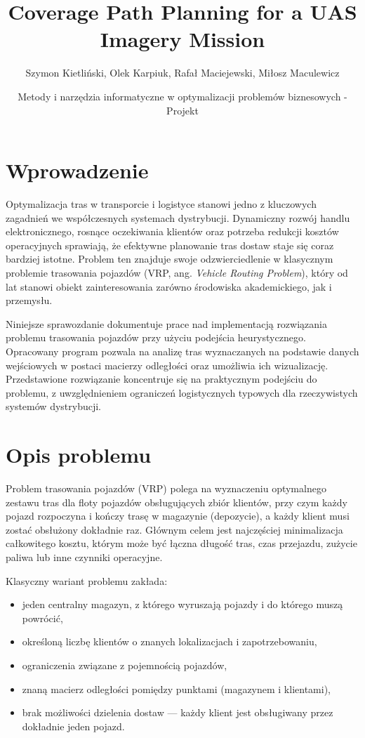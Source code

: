 \documentclass{article}
\title{Coverage Path Planning for a UAS Imagery Mission}
\author{Szymon Kietliński, Olek Karpiuk, Rafał Maciejewski, Miłosz Maculewicz}
\date{Metody i narzędzia informatyczne w optymalizacji problemów biznesowych - Projekt}
\begin{document}
\maketitle
\section{Wprowadzenie}

Optymalizacja tras w transporcie i logistyce stanowi jedno z kluczowych zagadnień we współczesnych systemach dystrybucji. Dynamiczny rozwój handlu elektronicznego, rosnące oczekiwania klientów oraz potrzeba redukcji kosztów operacyjnych sprawiają, że efektywne planowanie tras dostaw staje się coraz bardziej istotne. Problem ten znajduje swoje odzwierciedlenie w klasycznym problemie trasowania pojazdów (VRP, ang. \textit{Vehicle Routing Problem}), który od lat stanowi obiekt zainteresowania zarówno środowiska akademickiego, jak i przemysłu.

Niniejsze sprawozdanie dokumentuje prace nad implementacją rozwiązania problemu trasowania pojazdów przy użyciu podejścia heurystycznego. Opracowany program pozwala na analizę tras wyznaczanych na podstawie danych wejściowych w postaci macierzy odległości oraz umożliwia ich wizualizację. Przedstawione rozwiązanie koncentruje się na praktycznym podejściu do problemu, z uwzględnieniem ograniczeń logistycznych typowych dla rzeczywistych systemów dystrybucji.

\section{Opis problemu}

Problem trasowania pojazdów (VRP) polega na wyznaczeniu optymalnego zestawu tras dla floty pojazdów obsługujących zbiór klientów, przy czym każdy pojazd rozpoczyna i kończy trasę w magazynie (depozycie), a każdy klient musi zostać obsłużony dokładnie raz. Głównym celem jest najczęściej minimalizacja całkowitego kosztu, którym może być łączna długość tras, czas przejazdu, zużycie paliwa lub inne czynniki operacyjne.

Klasyczny wariant problemu zakłada:
\begin{itemize}
  \item jeden centralny magazyn, z którego wyruszają pojazdy i do którego muszą powrócić,
  \item określoną liczbę klientów o znanych lokalizacjach i zapotrzebowaniu,
  \item ograniczenia związane z pojemnością pojazdów,
  \item znaną macierz odległości pomiędzy punktami (magazynem i klientami),
  \item brak możliwości dzielenia dostaw — każdy klient jest obsługiwany przez dokładnie jeden pojazd.
\end{itemize}
\end{document}
